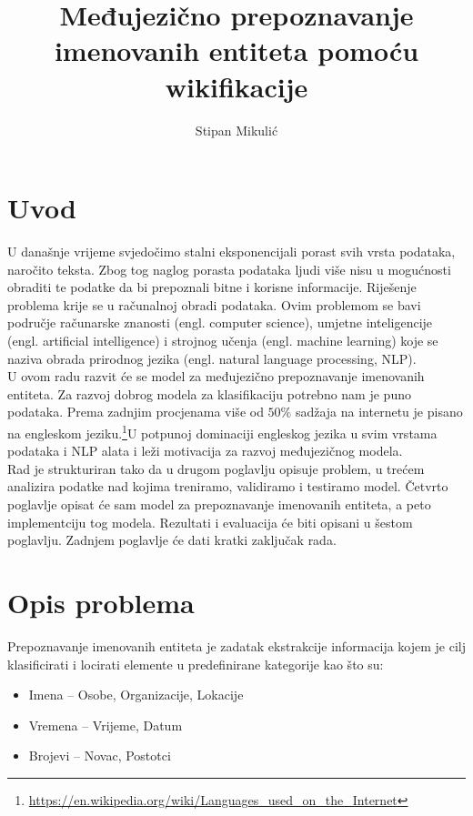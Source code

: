 \documentclass[times, utf8, seminar]{fer}
\begin{document}
\title{Međujezično prepoznavanje imenovanih entiteta pomoću wikifikacije}

\author{Stipan Mikulić}

\maketitle

\tableofcontents

\chapter{Uvod}
U današnje vrijeme svjedočimo stalni eksponencijali porast svih vrsta podataka, naročito teksta. Zbog tog naglog porasta podataka ljudi više nisu u mogućnosti obraditi te podatke da bi prepoznali bitne i korisne informacije. Riješenje problema krije se u računalnoj obradi podataka. 
Ovim problemom se bavi područje računarske znanosti (engl. computer science), umjetne inteligencije (engl. artificial intelligence) i strojnog učenja (engl. machine learning) koje se naziva obrada prirodnog jezika (engl. natural language processing, NLP). \\
\indent U ovom radu razvit će se model za međujezično prepoznavanje imenovanih entiteta. Za razvoj dobrog modela za klasifikaciju potrebno nam je puno podataka. Prema zadnjim procjenama više od $ 50\% $ sadžaja na internetu je pisano na engleskom jeziku.\footnote{\url{https://en.wikipedia.org/wiki/Languages_used_on_the_Internet}}U potpunoj dominaciji engleskog jezika u svim vrstama podataka i NLP alata i leži motivacija za razvoj međujezičnog modela. \\
\indent Rad je strukturiran tako da u drugom poglavlju opisuje problem, u trećem analizira podatke nad kojima treniramo, validiramo i testiramo model. Četvrto poglavlje opisat će sam model za prepoznavanje imenovanih entiteta, a peto implementciju tog modela. Rezultati i evaluacija će biti opisani u šestom poglavlju. Zadnjem poglavlje će dati kratki zaključak rada.
\chapter{Opis problema}

Prepoznavanje imenovanih entiteta je zadatak ekstrakcije informacija kojem je cilj klasificirati i locirati elemente u predefinirane kategorije kao što su:

\begin{itemize}
	\item Imena -- Osobe, Organizacije, Lokacije
	\item Vremena -- Vrijeme, Datum
	\item Brojevi -- Novac, Postotci
\end{itemize}
\end{document}

